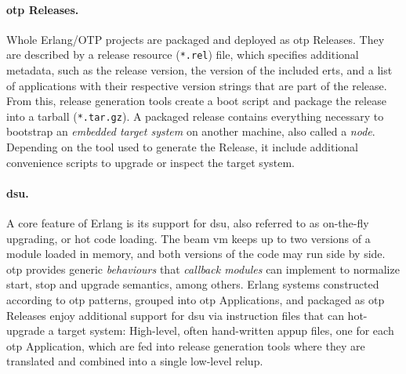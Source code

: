 \paragraph{\acrshort{otp} Releases.} Whole Erlang/OTP projects are packaged and deployed as \acrshort{otp} Releases. They are described by a release resource (\lstinline|*.rel|) file, which specifies additional metadata, such as the release version, the version of the included \acrfull{erts}, and a list of applications with their respective version strings that are part of the release. From this, release generation tools create a boot script and package the release into a tarball (\lstinline|*.tar.gz|). A packaged release contains everything necessary to bootstrap an \emph{embedded target system} on another machine, also called a \emph{node}. Depending on the tool used to generate the Release, it include additional convenience scripts to upgrade or inspect the target system.

\paragraph{\acrlong{dsu}.} A core feature of Erlang is its support for \acrfull{dsu}, also referred to as on-the-fly upgrading, or hot code loading. The \acrshort{beam} \acrshort{vm} keeps up to two versions of a module loaded in memory, and both versions of the code may run side by side. \acrshort{otp} provides generic \emph{behaviours} that \emph{callback modules} can implement to normalize start, stop and upgrade semantics, among others. Erlang systems constructed according to \acrshort{otp} patterns, grouped into \acrshort{otp} Applications, and packaged as \acrshort{otp} Releases enjoy additional support for \acrshort{dsu} via instruction files that can hot-upgrade a target system: High-level, often hand-written \acrfull{appup} files, one for each \acrshort{otp} Application, which are fed into release generation tools where they are translated and combined into a single low-level \acrshort{relup}.


